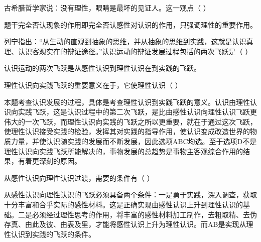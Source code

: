 \question 古希腊哲学家说：没有理性，眼睛是最坏的见证人。这一观点（ ）
\par{}
\begin{solution}题干完全否认现象的作用即完全否认感性对认识的作用，只强调理性的重要作用。
\end{solution}
\question 列宁指出：``从生动的直观到抽象的思维，并从抽象的思维到实践，这就是认识真理、认识客观实在的辩证途径。''认识运动的辩证发展过程包括的两次飞跃是（
）
\par{}
\begin{solution}认识运动的两次飞跃是从感性认识到理性认识在到实践的飞跃。
\end{solution}
\question 理性认识向实践飞跃的重要意义在于，它使理性认识（ ）
\par{}
\begin{solution}本题考查认识发展的过程，具体是考查理性认识到实践飞跃的意义。认识由理性认识向实践飞跃，这是认识过程中的第二次飞跃，是比由感性认识向理性认识飞跃更伟大的一次飞跃，而理性认识向实践的飞跃之所以更重要，就在于通过这次飞跃，使理性认识接受实践的检验，发挥其对实践的指导作用，使认识变成改造世界的物质力量，并使认识随实践的发展而不断发展，因此选项ABC均选。至于选项D不是理性认识向实践飞跃所能解决的，事物发展的总趋势是事物主客观综合作用的结果，有着更深刻的原因。
\end{solution}
\question 从感性认识向理性认识过渡，需要的条件有（ ）
\par{}
\begin{solution}从感性认识向理性认识的飞跃必须具备两个条件：一是勇于实践，深入调查，获取十分丰富和合乎实际的感性材料。这是正确实现由感性认识上升到理性认识的基础。二是必须经过理性思考的作用，将丰富的感性材料加工制作，去粗取精、去伪存真、由此及彼、由表及里，才能将感性认识上升为理性认识。而AB是实现从理性认识到实践的飞跃的条件。
\end{solution}
